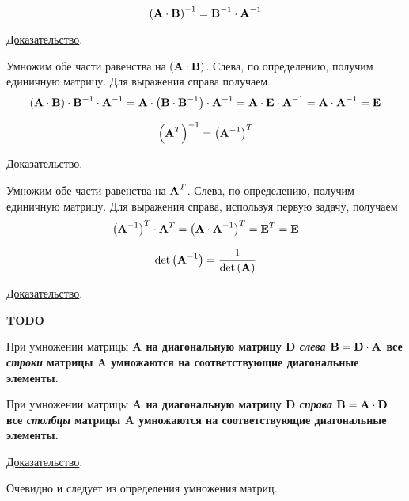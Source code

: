 \begin{theorem}
    \begin{equation*}
        \left( \bf{A} \cdot \bf{B} \right)^{-1} = \bf{B}^{-1} \cdot \bf{A}^{-1}
    \end{equation*}

    \underline{Доказательство}.
    \vspace{5pt}

    Умножим обе части равенства на $\left( \bf{A} \cdot \bf{B} \right)$. Слева, по определению, получим единичную матрицу.
    Для выражения справа получаем
    \begin{equation*}
        \left( \bf{A} \cdot \bf{B} \right) \cdot \bf{B}^{-1} \cdot \bf{A}^{-1} = \bf{A} \cdot \left( \bf{B} \cdot \bf{B}^{-1} \right) \cdot \bf{A}^{-1} =
        \bf{A} \cdot \bf{E} \cdot \bf{A}^{-1} = \bf{A} \cdot \bf{A}^{-1} = \bf{E}
    \end{equation*}
\end{theorem}
\pagebreak
\begin{theorem}
    \begin{equation*}
        \left( \bf{A}^T \right)^{-1} = \left( \bf{A}^{-1} \right)^T
    \end{equation*}

    \underline{Доказательство}.
    \vspace{5pt}

    Умножим обе части равенства на $\displaystyle \bf{A}^T$. Слева, по определению, получим единичную матрицу. Для
    выражения справа, используя первую задачу, получаем
    \begin{equation*}
        \left( \bf{A}^{-1} \right)^T \cdot \bf{A}^T = \left( \bf{A} \cdot \bf{A}^{-1} \right)^T = \bf{E}^T = \bf{E}
    \end{equation*}
\end{theorem}

\begin{theorem}
    \begin{equation*}
        \det \left( \bf{A}^{-1} \right) = \frac{1}{\det\left( \bf{A} \right)}
    \end{equation*}

    \underline{Доказательство}.
    \vspace{5pt}

    \bf{TODO}
\end{theorem}

\begin{theorem}
    При умножении матрицы \bf{A} на диагональную матрицу \bf{D} \emph{слева} $\bf{B} = \bf{D} \cdot \bf{A}$ все \emph{строки}
    матрицы \bf{A} умножаются на соответствующие диагональные элементы.

    При умножении матрицы \bf{A} на диагональную матрицу \bf{D} \emph{справа} $\bf{B} = \bf{A} \cdot \bf{D}$ все
    \emph{столбцы} матрицы \bf{A} умножаются на соответствующие диагональные элементы.

    \underline{Доказательство}.
    \vspace{5pt}

    Очевидно и следует из определения умножения матриц.
\end{theorem}

